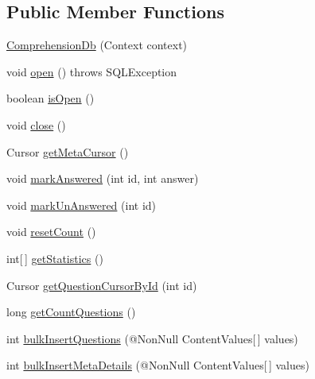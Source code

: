 \subsection*{Public Member Functions}
\begin{DoxyCompactItemize}
\item 
\hyperlink{classorg_1_1buildmlearn_1_1comprehension_1_1data_1_1ComprehensionDb_a18d923521f667b3af2479b01d454e6cc}{Comprehension\+Db} (Context context)
\item 
void \hyperlink{classorg_1_1buildmlearn_1_1comprehension_1_1data_1_1ComprehensionDb_a8d9b4d971abbed3be48d67ac0eaac303}{open} ()  throws S\+Q\+L\+Exception 
\item 
boolean \hyperlink{classorg_1_1buildmlearn_1_1comprehension_1_1data_1_1ComprehensionDb_ae462f748093defd2b32ad82297b1ca99}{is\+Open} ()
\item 
void \hyperlink{classorg_1_1buildmlearn_1_1comprehension_1_1data_1_1ComprehensionDb_afc1bb87a7bffb50b30e2082f2857b259}{close} ()
\item 
Cursor \hyperlink{classorg_1_1buildmlearn_1_1comprehension_1_1data_1_1ComprehensionDb_a102f9f15f29353862e32bfbe8e678d44}{get\+Meta\+Cursor} ()
\item 
void \hyperlink{classorg_1_1buildmlearn_1_1comprehension_1_1data_1_1ComprehensionDb_a6564b9020db88ece2f43d2b5fc43482a}{mark\+Answered} (int id, int answer)
\item 
void \hyperlink{classorg_1_1buildmlearn_1_1comprehension_1_1data_1_1ComprehensionDb_a31578ec81ee365ef299b92c925c75ead}{mark\+Un\+Answered} (int id)
\item 
void \hyperlink{classorg_1_1buildmlearn_1_1comprehension_1_1data_1_1ComprehensionDb_aa69e79cdfa508b163c551112d3367260}{reset\+Count} ()
\item 
int\mbox{[}$\,$\mbox{]} \hyperlink{classorg_1_1buildmlearn_1_1comprehension_1_1data_1_1ComprehensionDb_a762ab1d133dd5b82fa348c60840692e3}{get\+Statistics} ()
\item 
Cursor \hyperlink{classorg_1_1buildmlearn_1_1comprehension_1_1data_1_1ComprehensionDb_ac4fc5d917521879cbfedc23d7da73ce9}{get\+Question\+Cursor\+By\+Id} (int id)
\item 
long \hyperlink{classorg_1_1buildmlearn_1_1comprehension_1_1data_1_1ComprehensionDb_ac469de0c84c04dd34c22b7a5ee9b2639}{get\+Count\+Questions} ()
\item 
int \hyperlink{classorg_1_1buildmlearn_1_1comprehension_1_1data_1_1ComprehensionDb_a27aec85c75534e413ac7a239b2db192a}{bulk\+Insert\+Questions} (@Non\+Null Content\+Values\mbox{[}$\,$\mbox{]} values)
\item 
int \hyperlink{classorg_1_1buildmlearn_1_1comprehension_1_1data_1_1ComprehensionDb_a7888797b936aff24f5cbb451d45cd7b8}{bulk\+Insert\+Meta\+Details} (@Non\+Null Content\+Values\mbox{[}$\,$\mbox{]} values)
\end{DoxyCompactItemize}
